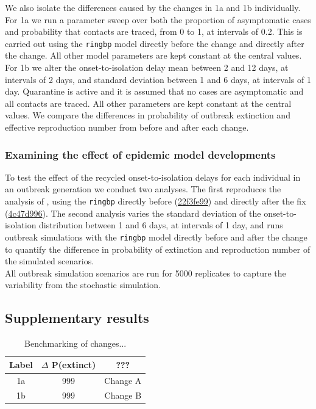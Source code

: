 \documentclass[12pt, letterpaper]{article}
\newcommand{\ghcommit}[1]{\href{https://github.com/epiforecasts/ringbp/commit/#1}{#1}}
\begin{document}
We also isolate the differences caused by the changes in 1a and 1b individually. For 1a we run a parameter sweep over both the proportion of asymptomatic cases and probability that contacts are traced, from 0 to 1, at intervals of 0.2. This is carried out using the \texttt{ringbp} model directly before the change and directly after the change. All other model parameters are kept constant at the \cite{Hellewell2020} central values. For 1b we alter the onset-to-isolation delay mean between 2 and 12 days, at intervals of 2 days, and standard deviation between 1 and 6 days, at intervals of 1 day. Quarantine is active and it is assumed that no cases are asymptomatic and all contacts are traced. All other parameters are kept constant at the \cite{Hellewell2020} central values. We compare the differences in probability of outbreak extinction and effective reproduction number from before and after each change. \\

\subsubsection*{Examining the effect of epidemic model developments}

To test the effect of the recycled onset-to-isolation delays for each individual in an outbreak generation we conduct two analyses. The first reproduces the analysis of \cite{Hellewell2020}, using the \texttt{ringbp} directly before (\ghcommit{22f3fe99}) and directly after the fix (\ghcommit{4c47d996}). The second analysis varies the standard deviation of the onset-to-isolation distribution between 1 and 6 days, at intervals of 1 day, and runs outbreak simulations with the \texttt{ringbp} model directly before and after the change to quantify the difference in probability of extinction and reproduction number of the simulated scenarios. \\

All outbreak simulation scenarios are run for 5000 replicates to capture the variability from the stochastic simulation. \\

\subsection*{Supplementary results}

\begin{table}[h!]
\centering
  \caption{Benchmarking of changes...}
  \label{tab:benchmark-table}
 \begin{tabular}{|c|c|c|}
 \hline
 Label & $\Delta$ P(extinct) & ??? \\
 \hline\hline
 1a & 999 & Change A \\
 \hline
 1b & 999 & Change B \\
 \hline
 \end{tabular}
\end{table}
\end{document}
